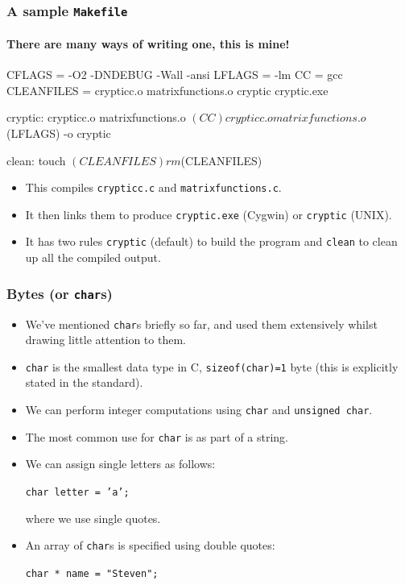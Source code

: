 \documentclass[table]{beamer}
\newif\ifschigh\schighfalse
\newcommand{\kw}[1]{\ifschigh\textcolor{red}{#1}\else\textcolor{keyword}{#1}\fi}
\newcommand{\kt}[1]{\ifschigh\textcolor{red}{#1}\else\textcolor{ctext}{#1}\fi}
\begin{document}
\begin{frame}[fragile]
\frametitle{A sample {\tt Makefile}}
\framesubtitle{There are many ways of writing one, this is mine!}
\begin{exampleblock}{}
\begin{semiverbatim}
\scriptsize
CFLAGS = -O2 -DNDEBUG -Wall -ansi
LFLAGS = -lm
CC = gcc
CLEANFILES = crypticc.o matrixfunctions.o cryptic cryptic.exe

cryptic: crypticc.o matrixfunctions.o
         $(CC) crypticc.o matrixfunctions.o $(LFLAGS) -o cryptic
         
clean:
        touch $(CLEANFILES)
        rm $(CLEANFILES)
\end{semiverbatim}
\end{exampleblock}
\begin{itemize}
\item This compiles {\tt crypticc.c} and {\tt matrixfunctions.c}.
\item It then links them to produce {\tt cryptic.exe} (Cygwin) or {\tt cryptic} (UNIX).
\item It has two rules {\tt cryptic} (default) to build the program and {\tt clean} to clean up all the compiled output.
\end{itemize}
\end{frame}

\begin{frame}
\frametitle{Bytes (or {\tt char}s)}
\begin{itemize}
\item We've mentioned {\tt \kw{char}}s briefly so far, and used them extensively whilst drawing little attention to them.
\item {\tt \kw{char}} is the smallest data type in C, {\tt \kw{sizeof}(\kw{char})=1} byte (this is explicitly stated in the standard).
\item We can perform integer computations using {\tt \kw{char}} and {\tt \kw{unsigned char}}.
\item The most common use for {\tt \kw{char}} is as part of a string.
\item We can assign single letters as follows:
\begin{center}
{\tt \kw{char} letter = \kt{'a'};}
\end{center}
where we use single quotes.
\item An array of {\tt \kw{char}}s is specified using double quotes:
\begin{center}
\tt \kw{char} * name = \kt{"Steven"};
\end{center}
\end{itemize}
\end{frame}
\end{document}
